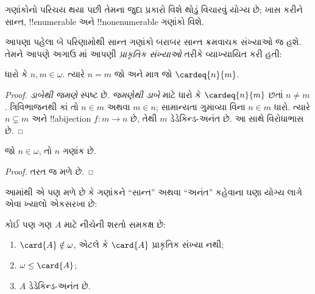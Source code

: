 \documentclass[../../../include/open-logic-section]{subfiles}
\begin{document}

ગણાંકોનો પરિચય થયા પછી તેમના જુદા પ્રકારો વિશે થોડું
વિચારવું યોગ્ય છે; ખાસ કરીને સાન્ત, !!{enumerable}
અને !!{nonenumerable} ગણાંકો વિશે.

આપણા પહેલા બે પરિણામોથી સાન્ત ગણાંકો બરાબર સાન્ત
ક્રમવાચક સંખ્યાઓ જ હશે. તેમને આપણે અગાઉ
માં આપણી
\emph{પ્રાકૃતિક સંખ્યાઓ} તરીકે વ્યાખ્યાયિત કરી હતી:

\begin{prop}
ધારો કે $n, m \in \omega$. ત્યારે $n = m$ જો અને માત્ર જો
$\cardeq{n}{m}$.
\end{prop}

\begin{proof}
\emph{ડાબેથી જમણે} સ્પષ્ટ છે. \emph{જમણેથી ડાબે}
માટે ધારો કે $\cardeq{n}{m}$ છતાં $n \neq m$.
ત્રિવિભાજનથી કાં તો $n \in m$ અથવા $m \in n$;
સામાન્યતા ગુમાવ્યા વિના $n \in m$ ધારો.
ત્યારે $n \subsetneq m$ અને
!!a{bijection} $f \colon m \to n$ છે, તેથી $m$
ડેડેકિન્ડ-અનંત છે. આ
સાથે વિરોધાભાસ છે.
\end{proof}

\begin{cor}
જો $n \in \omega$, તો $n$ ગણાંક છે.
\end{cor}

\begin{proof}
તરત જ મળે છે.
\end{proof}
\noindent
આમાંથી એ પણ મળે છે કે ગણાંકને ``સાન્ત'' અથવા
``અનંત'' કહેવાના ઘણા યોગ્ય લાગે એવા ખ્યાલો એકસરખા છે:
\begin{thm}કોઈ પણ ગણ $A$ માટે નીચેની શરતો સમકક્ષ છે:
\begin{enumerate}
	\item{} $\card{A} \notin \omega$, એટલે કે
	$\card{A}$ પ્રાકૃતિક સંખ્યા નથી;
	\item{} $\omega \leq \card{A}$;
	\item{} $A$ ડેડેકિન્ડ-અનંત છે.
\end{enumerate}
\end{thm}
\end{document}
